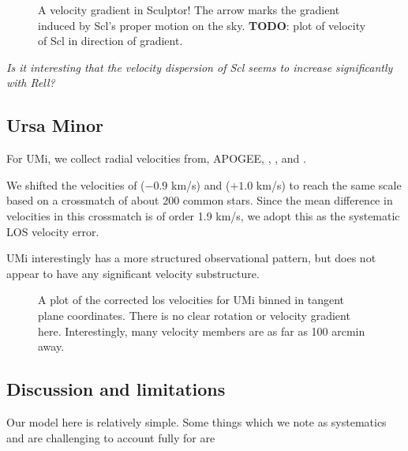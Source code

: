 \begin{figure}
\centering
{}
\caption[Scl velocity gradient]{A velocity gradient in Sculptor! The
arrow marks the gradient induced by Scl's proper motion on the sky.
\textbf{TODO}: plot of velocity of Scl in direction of gradient.}
\end{figure}

\emph{Is it interesting that the velocity dispersion of Scl seems to
increase significantly with Rell?}

\subsection{Ursa Minor}\label{ursa-minor}

For UMi, we collect radial velocities from, APOGEE,
\citet{sestito+2024b}, \citet{pace+2020}, and \citet{spencer+2018}.

We shifted the velocities of \citet{spencer+2018} (\(-0.9\) km/s) and
\citet{pace+2020} (\(+1.0\) km/s) to reach the same scale based on a
crossmatch of about 200 common stars. Since the mean difference in
velocities in this crossmatch is of order 1.9 km/s, we adopt this as the
systematic LOS velocity error.

UMi interestingly has a more structured observational pattern, but does
not appear to have any significant velocity substructure.

\begin{figure}
\centering
{}
\caption[UMi velocity sample]{A plot of the corrected los velocities for
UMi binned in tangent plane coordinates. There is no clear rotation or
velocity gradient here. Interestingly, many velocity members are as far
as 100 arcmin away.}
\end{figure}

\subsection{Discussion and
limitations}\label{discussion-and-limitations}

Our model here is relatively simple. Some things which we note as
systematics and are challenging to account fully for are

